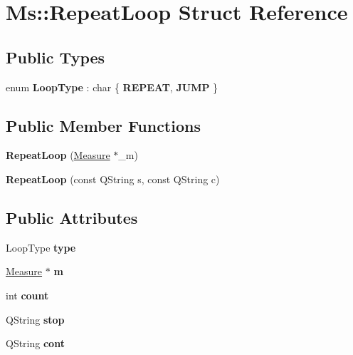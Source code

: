 \hypertarget{struct_ms_1_1_repeat_loop}{}\section{Ms\+:\+:Repeat\+Loop Struct Reference}
\label{struct_ms_1_1_repeat_loop}
\subsection*{Public Types}
\begin{DoxyCompactItemize}
\item 
\mbox{\label{struct_ms_1_1_repeat_loop_a225f10edd2c20c1facc6c19afaacf911}} 
enum {\bfseries Loop\+Type} \+: char \{ {\bfseries R\+E\+P\+E\+AT}, 
{\bfseries J\+U\+MP}
 \}
\end{DoxyCompactItemize}
\subsection*{Public Member Functions}
\begin{DoxyCompactItemize}
\item 
\mbox{\label{struct_ms_1_1_repeat_loop_a43faa03e161cafc73822046168b858c3}} 
{\bfseries Repeat\+Loop} (\hyperlink{class_ms_1_1_measure}{Measure} $\ast$\+\_\+m)
\item 
\mbox{\label{struct_ms_1_1_repeat_loop_af6a538b5a3ffbba5f921a09257c7660d}} 
{\bfseries Repeat\+Loop} (const Q\+String s, const Q\+String c)
\end{DoxyCompactItemize}
\subsection*{Public Attributes}
\begin{DoxyCompactItemize}
\item 
\mbox{\label{struct_ms_1_1_repeat_loop_a3c2ae6435460faa853ad9e99f8173ad9}} 
Loop\+Type {\bfseries type}
\item 
\mbox{\label{struct_ms_1_1_repeat_loop_ad8f9dededb39cfe0a55701909a06c209}} 
\hyperlink{class_ms_1_1_measure}{Measure} $\ast$ {\bfseries m}
\item 
\mbox{\label{struct_ms_1_1_repeat_loop_a1322582fa53b3ede3951c0751497ec44}} 
int {\bfseries count}
\item 
\mbox{\label{struct_ms_1_1_repeat_loop_a2e627aa5e3cdb7f233777bd2c5ff98a4}} 
Q\+String {\bfseries stop}
\item 
\mbox{\label{struct_ms_1_1_repeat_loop_a6791a479db9cbcca88e7d437414b9840}} 
Q\+String {\bfseries cont}
\end{DoxyCompactItemize}


